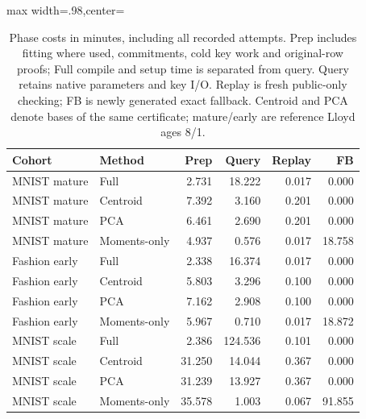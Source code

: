 \begin{table}[tbp]
\centering
\setlength{\tabcolsep}{8pt}
\caption{Phase costs in minutes, including all recorded attempts. Prep includes fitting where used, commitments, cold key work and original-row proofs; Full compile and setup time is separated from query. Query retains native parameters and key I/O. Replay is fresh public-only checking; FB is newly generated exact fallback. Centroid and PCA denote bases of the same certificate; mature/early are reference Lloyd ages 8/1.}
\label{tab:matched-components}
\begin{adjustbox}{max width=.98\textwidth,center=\textwidth}
\begin{tabular}{llrrrr}
\toprule
Cohort & Method & Prep & Query & Replay & FB\\
\midrule
MNIST mature & Full & 2.731 & 18.222 & 0.017 & 0.000\\
MNIST mature & Centroid & 7.392 & 3.160 & 0.201 & 0.000\\
MNIST mature & PCA & 6.461 & 2.690 & 0.201 & 0.000\\
MNIST mature & Moments-only & 4.937 & 0.576 & 0.017 & 18.758\\
Fashion early & Full & 2.338 & 16.374 & 0.017 & 0.000\\
Fashion early & Centroid & 5.803 & 3.296 & 0.100 & 0.000\\
Fashion early & PCA & 7.162 & 2.908 & 0.100 & 0.000\\
Fashion early & Moments-only & 5.967 & 0.710 & 0.017 & 18.872\\
MNIST scale & Full & 2.386 & 124.536 & 0.101 & 0.000\\
MNIST scale & Centroid & 31.250 & 14.044 & 0.367 & 0.000\\
MNIST scale & PCA & 31.239 & 13.927 & 0.367 & 0.000\\
MNIST scale & Moments-only & 35.578 & 1.003 & 0.067 & 91.855\\
\bottomrule
\end{tabular}
\end{adjustbox}
\end{table}
